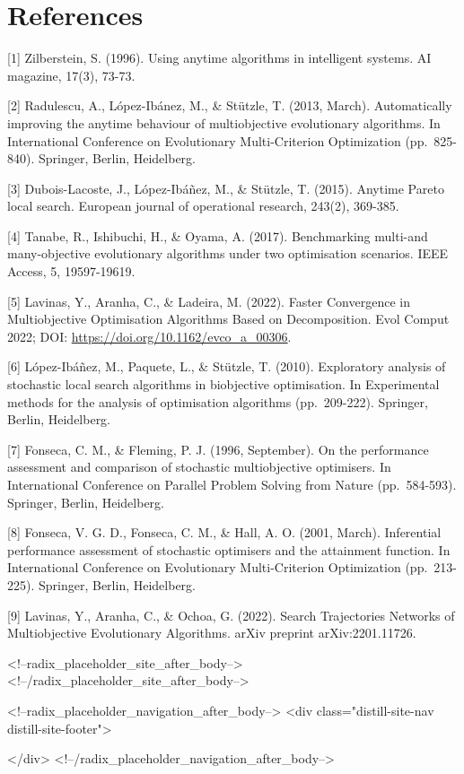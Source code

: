 \documentclass[
]{article}
\begin{document}
\hypertarget{references}{%
\section{References}\label{references}}

{[}1{]} Zilberstein, S. (1996). Using anytime algorithms in intelligent
systems. AI magazine, 17(3), 73-73.

{[}2{]} Radulescu, A., López-Ibánez, M., \& Stützle, T. (2013, March).
Automatically improving the anytime behaviour of multiobjective
evolutionary algorithms. In International Conference on Evolutionary
Multi-Criterion Optimization (pp.~825-840). Springer, Berlin,
Heidelberg.

{[}3{]} Dubois-Lacoste, J., López-Ibáñez, M., \& Stützle, T. (2015).
Anytime Pareto local search. European journal of operational research,
243(2), 369-385.

{[}4{]} Tanabe, R., Ishibuchi, H., \& Oyama, A. (2017). Benchmarking
multi-and many-objective evolutionary algorithms under two optimisation
scenarios. IEEE Access, 5, 19597-19619.

{[}5{]} Lavinas, Y., Aranha, C., \& Ladeira, M. (2022). Faster
Convergence in Multiobjective Optimisation Algorithms Based on
Decomposition. Evol Comput 2022; DOI:
\url{https://doi.org/10.1162/evco_a_00306}.

{[}6{]} López-Ibáñez, M., Paquete, L., \& Stützle, T. (2010).
Exploratory analysis of stochastic local search algorithms in
biobjective optimisation. In Experimental methods for the analysis of
optimisation algorithms (pp.~209-222). Springer, Berlin, Heidelberg.

{[}7{]} Fonseca, C. M., \& Fleming, P. J. (1996, September). On the
performance assessment and comparison of stochastic multiobjective
optimisers. In International Conference on Parallel Problem Solving from
Nature (pp.~584-593). Springer, Berlin, Heidelberg.

{[}8{]} Fonseca, V. G. D., Fonseca, C. M., \& Hall, A. O. (2001, March).
Inferential performance assessment of stochastic optimisers and the
attainment function. In International Conference on Evolutionary
Multi-Criterion Optimization (pp.~213-225). Springer, Berlin,
Heidelberg.

{[}9{]} Lavinas, Y., Aranha, C., \& Ochoa, G. (2022). Search
Trajectories Networks of Multiobjective Evolutionary Algorithms. arXiv
preprint arXiv:2201.11726.

<!--radix_placeholder_site_after_body-->
<!--/radix_placeholder_site_after_body-->

<!--radix_placeholder_navigation_after_body-->
<div class="distill-site-nav distill-site-footer">

</div>
<!--/radix_placeholder_navigation_after_body-->
\end{document}
